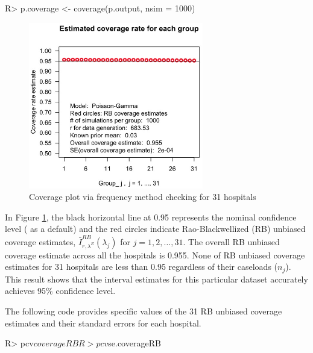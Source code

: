 \documentclass[article]{jss}
\begin{document}
\begin{CodeChunk}
\begin{CodeInput}
R> p.coverage <- coverage(p.output, nsim = 1000)
\end{CodeInput}
\end{CodeChunk}
\begin{figure}[h] 
\begin{center}
\includegraphics[width = 3in]{hospital2.png}
\caption{Coverage plot via frequency method checking for 31 hospitals}
\label{fig:hospitalcoverage}
\end{center}
\end{figure}

In Figure \ref{fig:hospitalcoverage}, the black horizontal line at 0.95 represents the nominal confidence level ( as a default) and the red circles indicate Rao-Blackwellized (RB) unbiased coverage estimates, $\bar{I}^{RB}_{r, \lambda^E}(\lambda_j)$ for $j=1, 2, \ldots, 31$. The overall RB unbiased coverage estimate across all the hospitals is 0.955. None of RB unbiased coverage estimates for 31 hospitals are less than 0.95 regardless of their caseloads ($n_{j}$). This result shows that the interval estimates for this particular dataset accurately achieves 95\% confidence level. 


The following code provides specific values of the 31 RB unbiased coverage estimates and their standard errors for each hospital.
\begin{CodeChunk}
\begin{CodeInput}
R> pcv$coverageRB
R> pcv$se.coverageRB
\end{CodeInput}
\end{CodeChunk}
\end{document}
